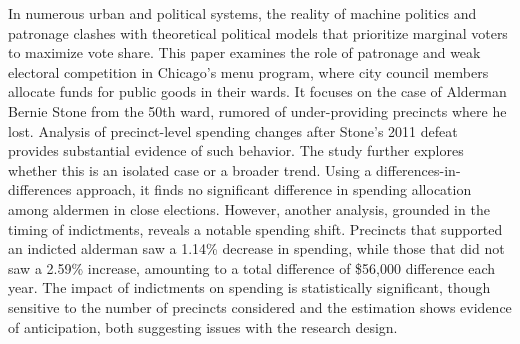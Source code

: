 \begin{spacing}{1.0}
    In numerous urban and political systems, the reality of machine politics and patronage clashes with theoretical political models that prioritize marginal voters to maximize vote share.
    This paper examines the role of patronage and weak electoral competition in Chicago's menu program, where city council members allocate funds for public goods in their wards.
    It focuses on the case of Alderman Bernie Stone from the 50th ward, rumored of under-providing precincts where he lost. Analysis of precinct-level spending changes after Stone's 2011 defeat provides substantial evidence of such behavior. 
    The study further explores whether this is an isolated case or a broader trend. 
    Using a differences-in-differences approach, it finds no significant difference in spending allocation among aldermen in close elections. 
    However, another analysis, grounded in the timing of indictments, reveals a notable spending shift. 
    Precincts that supported an indicted alderman saw a 1.14\% decrease in spending, while those that did not saw a 2.59\% increase, amounting to a total difference of \$56,000 difference each year. 
    The impact of indictments on spending is statistically significant, though sensitive to the number of precincts considered and the estimation shows evidence of anticipation, both suggesting issues with the research design.
\end{spacing}